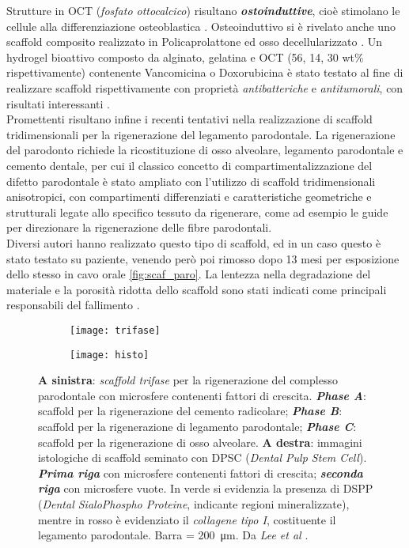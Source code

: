 Strutture in OCT (\emph{fosfato ottocalcico}) risultano \emph{\textbf{ostoinduttive}}, cioè stimolano le cellule alla differenziazione osteoblastica \parencite{Reference130}. Osteoinduttivo si è rivelato anche uno scaffold composito realizzato in Policaprolattone ed osso decellularizzato \parencite{Reference132}. Un hydrogel bioattivo composto da alginato, gelatina e OCT (56, 14, 30 wt\% rispettivamente) contenente Vancomicina o Doxorubicina è stato testato al fine di realizzare scaffold rispettivamente con proprietà \emph{antibatteriche} e \emph{antitumorali}, con risultati interessanti \parencite{Reference133}.\\
Promettenti risultano infine i recenti tentativi nella realizzazione di scaffold tridimensionali per la rigenerazione del legamento parodontale. La rigenerazione del parodonto richiede la ricostituzione di osso alveolare, legamento parodontale e cemento dentale, per cui il classico concetto di compartimentalizzazione del difetto parodontale è stato ampliato con l'utilizzo di scaffold tridimensionali anisotropici, con compartimenti differenziati e caratteristiche geometriche e strutturali legate allo specifico tessuto da rigenerare, come ad esempio le guide per direzionare la rigenerazione delle fibre parodontali.\\
Diversi autori hanno realizzato questo tipo di scaffold, ed in un caso questo è stato testato su paziente, venendo però poi rimosso dopo 13 mesi per esposizione dello stesso in cavo orale \ref{fig:scaf_paro}. La lentezza nella degradazione del materiale e la porosità ridotta dello scaffold sono stati indicati come principali responsabili del fallimento \parencite{Reference134}.\\
\begin{figure}[h!]
 
\begin{subfigure}{0.5\textwidth}
\centering
\texttt{[image: trifase]} 
\label{fig:trifase}
\end{subfigure}
\begin{subfigure}{0.5\textwidth}
\centering
\texttt{[image: histo]}
\label{fig:histo}
\end{subfigure}
\caption{\textbf{A sinistra}: \emph{scaffold trifase} per la rigenerazione del complesso parodontale con microsfere contenenti fattori di crescita. \emph{\textbf{Phase A}}: scaffold per la rigenerazione del cemento radicolare; \emph{\textbf{Phase B}}: scaffold per la rigenerazione di legamento parodontale; \emph{\textbf{Phase C}}: scaffold per la rigenerazione di osso alveolare. \textbf{A destra}: immagini istologiche di scaffold seminato con DPSC (\emph{Dental Pulp Stem Cell}). \emph{\textbf{Prima riga}} con microsfere contenenti fattori di crescita; \emph{\textbf{seconda riga}} con microsfere vuote. In verde si evidenzia la presenza di DSPP (\emph{Dental SialoPhospho Proteine}, indicante regioni mineralizzate), mentre in rosso è evidenziato il \emph{collagene tipo I}, costituente il legamento parodontale. Barra = \SI {200} {\micro\metre}. Da \emph{Lee et al} \parencite{Reference135}.}
\label{fig:scaffold_trifase}
\end{figure}
\pagebreak

